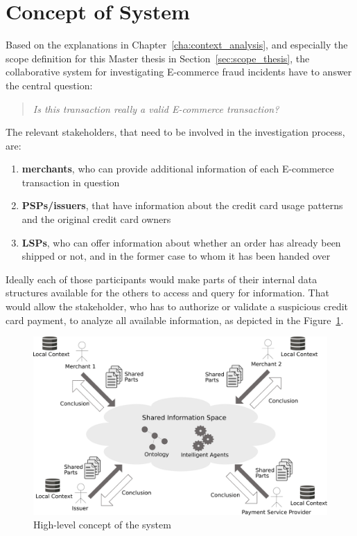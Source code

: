 
\section{Concept of System}
\label{sec:system_concept}

Based on the explanations in Chapter~\ref{cha:context_analysis}, and especially the scope definition for this Master thesis in Section~\ref{sec:scope_thesis}, the collaborative system for investigating \gls{E-commerce} fraud incidents have to answer the central question:\@

\begin{quotation}
  \textit{Is this transaction really a valid \gls{E-commerce} transaction?}
\end{quotation}

The relevant stakeholders, that need to be involved in the investigation process, are:\@

\begin{enumerate}
    \item \textbf{merchants}, who can provide additional information of each \gls{E-commerce} transaction in question
    \item \textbf{\gls{PSP}s/issuers}, that have information about the credit card usage patterns and the original credit card owners
    \item \textbf{\gls{LSP}s}, who can offer information about whether an order has already been shipped or not, and in the former case to whom it has been handed over
\end{enumerate}

Ideally each of those participants would make parts of their internal data structures available for the others to access and query for information. That would allow the stakeholder, who has to authorize or validate a suspicious credit card payment, to analyze all available information, as depicted in the Figure~\ref{fig:images_system_overview}.\@

\begin{figure}[H]
	\centering
		\includegraphics[width=0.9\columnwidth]{images/system_overview.pdf}
	\caption{High-level concept of the system}
\label{fig:images_system_overview}
\end{figure}

